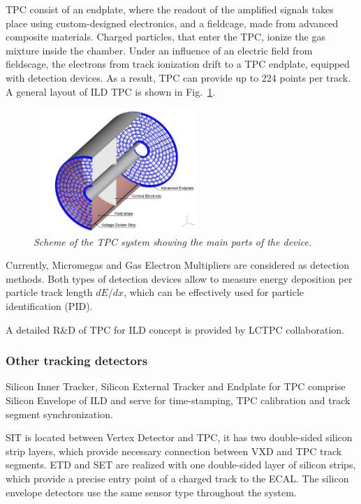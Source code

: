 TPC consist of an endplate, where the readout of the amplified signals takes place using custom-designed electronics, and a fieldcage, made from advanced composite materials. 
Charged particles, that enter the TPC, ionize the gas mixture inside the chamber. Under an influence of an electric field from fieldscage, the electrons from track ionization drift to a TPC endplate, equipped with detection devices. As a result, TPC can provide up to 224 points per track.
A general layout of ILD TPC is shown in Fig.~\ref{fig:ILCtpc}. 
\begin{figure}[H]
{\centering
    \includegraphics[width=0.55\textwidth]{graphics/ILCtpc.jpg}
    \caption{\sl Scheme of the TPC system showing the main parts of the device.}
    \label{fig:ILCtpc}
  }
\end{figure}

Currently, Micromegas and Gas Electron Multipliers are considered as detection methods. Both types of detection devices allow to measure energy deposition per particle track length $dE/dx$, which can be effectively used for particle identification (PID).

A detailed R\&D of TPC for ILD concept is provided by LCTPC collaboration.

\subsubsection{Other tracking detectors}
Silicon Inner Tracker, Silicon External Tracker and Endplate for TPC comprise Silicon Envelope of ILD and serve for time-stamping, TPC calibration and track segment synchronization. 


SIT is located between Vertex Detector and TPC, it has two double-sided silicon strip layers, which provide necessary connection between VXD and TPC track segments. ETD and SET are realized with one double-sided layer of silicon strips, which provide a precise entry point of a charged track to the ECAL. The silicon envelope detectors use the same sensor type throughout the system.

